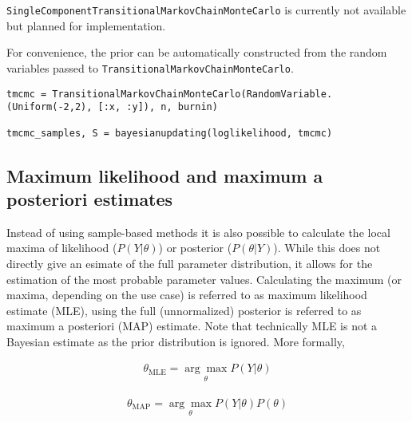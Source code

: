 \begin{tcolorbox}[toptitle=-1mm,bottomtitle=1mm,colback=admonition-note!50!white,colframe=admonition-note,title=\textbf{Note}]
\texttt{SingleComponentTransitionalMarkovChainMonteCarlo} is currently not available but planned for implementation.

\end{tcolorbox}


For convenience, the prior can be automatically constructed from the random variables passed to \texttt{TransitionalMarkovChainMonteCarlo}.




\begin{verbatim}
tmcmc = TransitionalMarkovChainMonteCarlo(RandomVariable.(Uniform(-2,2), [:x, :y]), n, burnin)

tmcmc_samples, S = bayesianupdating(loglikelihood, tmcmc)
\end{verbatim}



\subsection{Maximum likelihood and maximum a posteriori estimates}



\label{15340629227974867440}{}


Instead of using sample-based methods it is also possible to calculate the local maxima of likelihood (\(P(Y|\theta)\)) or posterior (\(P(\theta|Y)\)). While this does not directly give an esimate of the full parameter distribution, it allows for the estimation of the most probable parameter values. Calculating the maximum (or maxima, depending on the use case) is referred to as maximum likelihood estimate (MLE), using the full (unnormalized) posterior is referred to as maximum a posteriori (MAP) estimate. Note that technically MLE is not a Bayesian estimate as the prior distribution is ignored. More formally,



\begin{equation*}
\begin{split}\theta_{\text{MLE}} = \underset{\theta}{\arg \max} P(Y|\theta)\end{split}\end{equation*}


\begin{equation*}
\begin{split}\theta_{\text{MAP}} = \underset{\theta}{\arg \max} P(Y|\theta) P(\theta)\end{split}\end{equation*}


